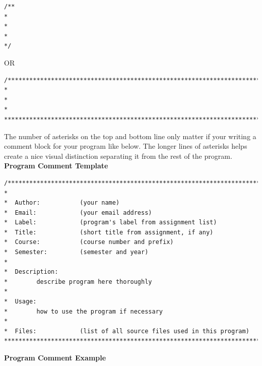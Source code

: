 \begin{verbatim}
/**
*
* 
*
*/
\end{verbatim}

OR

\begin{verbatim}
/*****************************************************************************
*
* 
*
*****************************************************************************/
\end{verbatim}



The number of asterisks on the top and bottom line only matter if your writing a comment block for your program like below. The longer lines of asterisks helps create a nice visual distinction separating it from the rest of the program.\\

\textbf{Program Comment Template}\\

\begin{verbatim}
/*****************************************************************************
*                    
*  Author:           (your name)
*  Email:            (your email address)
*  Label:            (program's label from assignment list)
*  Title:            (short title from assignment, if any)
*  Course:           (course number and prefix)
*  Semester:         (semester and year)
* 
*  Description:
*        describe program here thoroughly 
* 
*  Usage:
*        how to use the program if necessary
* 
*  Files:            (list of all source files used in this program)
*****************************************************************************/
\end{verbatim}

\textbf{Program Comment Example}\\

